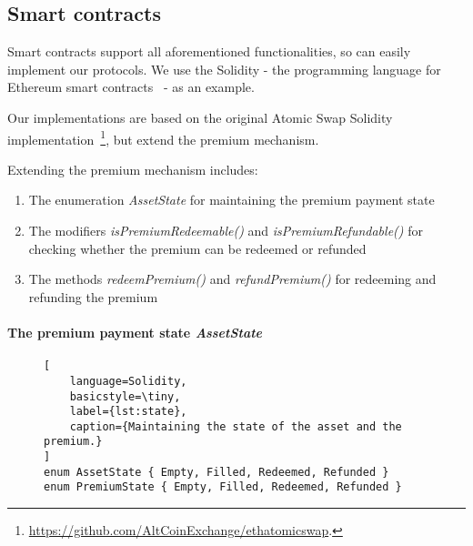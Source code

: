 \subsection{Smart contracts}

Smart contracts support all aforementioned functionalities, so can easily implement our protocols.
We use the Solidity - the programming language for Ethereum smart contracts~\cite{wood2014ethereum} - as an example.

Our implementations are based on the original Atomic Swap Solidity implementation~\footnote{\url{https://github.com/AltCoinExchange/ethatomicswap}.},
but extend the premium mechanism.

Extending the premium mechanism includes:
\begin{enumerate}
    \item The enumeration \textit{AssetState} for maintaining the premium payment state
    \item The modifiers \textit{isPremiumRedeemable()} and \textit{isPremiumRefundable()} for checking whether the premium can be redeemed or refunded
    \item The methods \textit{redeemPremium()} and \textit{refundPremium()} for redeeming and refunding the premium
\end{enumerate}

\paragraph{The premium payment state \textit{AssetState}}

\begin{figure}[htb]
\begin{lstlisting}[
    language=Solidity, 
    basicstyle=\tiny,
    label={lst:state},
    caption={Maintaining the state of the asset and the premium.}
]
enum AssetState { Empty, Filled, Redeemed, Refunded }
enum PremiumState { Empty, Filled, Redeemed, Refunded }
\end{lstlisting}
\end{figure}


